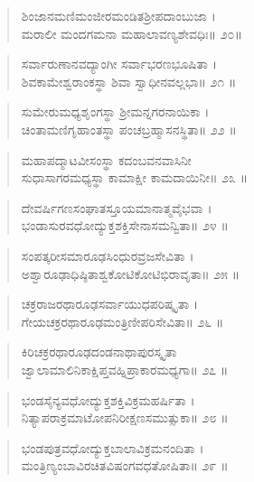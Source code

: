 \begin{verse}
ಶಿಂಜಾನಮಣಿಮಂಜೀರಮಂಡಿತಶ್ರೀಪದಾಂಬುಜಾ ।\\ಮರಾಲೀ ಮಂದಗಮನಾ ಮಹಾಲಾವಣ್ಯಶೇವಧಿಃ\num{॥ ೨೦॥}
\end{verse}

\begin{verse}
ಸರ್ವಾರುಣಾನವದ್ಯಾಂಗೀ  ಸರ್ವಾಭರಣಭೂಷಿತಾ ।\\ಶಿವಕಾಮೇಶ್ವರಾಂಕಸ್ಥಾ ಶಿವಾ ಸ್ವಾಧೀನವಲ್ಲಭಾ\num{॥ ೨೧ ॥}
\end{verse}

\begin{verse}
ಸುಮೇರುಮಧ್ಯಶೃಂಗಸ್ಥಾ ಶ್ರೀಮನ್ನಗರನಾಯಿಕಾ ।\\ಚಿಂತಾಮಣಿಗೃಹಾಂತಸ್ಥಾ ಪಂಚಬ್ರಹ್ಮಾಸನಸ್ಥಿತಾ\num{॥ ೨೨ ॥}
\end{verse}

\begin{verse}
ಮಹಾಪದ್ಮಾಟವೀಸಂಸ್ಥಾ ಕದಂಬವನವಾಸಿನೀ \\ಸುಧಾಸಾಗರಮಧ್ಯಸ್ಥಾ ಕಾಮಾಕ್ಷೀ ಕಾಮದಾಯಿನೀ\num{॥ ೨೩ ॥}
\end{verse}

\begin{verse}
ದೇವರ್ಷಿಗಣಸಂಘಾತಸ್ತೂಯಮಾನಾತ್ಮವೈಭವಾ ।\\ಭಂಡಾಸುರವಧೋದ್ಯುಕ್ತಶಕ್ತಿಸೇನಾಸಮನ್ವಿತಾ\num{॥ ೨೪ ॥}
\end{verse}

\begin{verse}
ಸಂಪತ್ಕರೀಸಮಾರೂಢಸಿಂಧುರವ್ರಜಸೇವಿತಾ ।\\ಅಶ್ವಾರೂಢಾಧಿಷ್ಠಿತಾಶ್ವಕೋಟಿಕೋಟಿಭಿರಾವೃತಾ\num{॥ ೨೫ ॥}
\end{verse}

\begin{verse}
ಚಕ್ರರಾಜರಥಾರೂಢಸರ್ವಾಯುಧಪರಿಷ್ಕೃತಾ ।\\ಗೇಯಚಕ್ರರಥಾರೂಢಮಂತ್ರಿಣೀಪರಿಸೇವಿತಾ\num{॥ ೨೬ ॥}
\end{verse}

\begin{verse}
ಕಿರಿಚಕ್ರರಥಾರೂಢದಂಡನಾಥಾಪುರಸ್ಕೃತಾ \\ಜ್ವಾಲಾಮಾಲಿನಿಕಾಕ್ಷಿಪ್ತವಹ್ನಿಪ್ರಾಕಾರಮಧ್ಯಗಾ\num{॥ ೨೭ ॥}
\end{verse}

\begin{verse}
ಭಂಡಸೈನ್ಯವಧೋದ್ಯುಕ್ತಶಕ್ತಿವಿಕ್ರಮಹರ್ಷಿತಾ ।\\ನಿತ್ಯಾಪರಾಕ್ರಮಾಟೋಪನಿರೀಕ್ಷಣಸಮುತ್ಸುಕಾ\num{॥ ೨೮ ॥}
\end{verse}

\begin{verse}
ಭಂಡಪುತ್ರವಧೋದ್ಯುಕ್ತಬಾಲಾವಿಕ್ರಮನಂದಿತಾ ।\\ಮಂತ್ರಿಣ್ಯಂಬಾವಿರಚಿತವಿಷಂಗವಧತೋಷಿತಾ\num{॥ ೨೯ ॥}
\end{verse}

